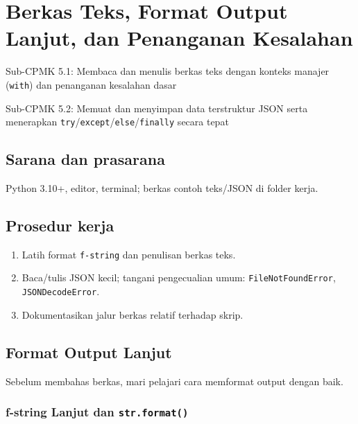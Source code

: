 \documentclass[../main.tex]{subfiles}
\begin{document}
\chapter{Berkas Teks, Format Output Lanjut, dan Penanganan Kesalahan}

\begin{subcpmk}
  \item Sub-CPMK 5.1: Membaca dan menulis berkas teks dengan konteks manajer (\texttt{with}) dan penanganan kesalahan dasar
  \item Sub-CPMK 5.2: Memuat dan menyimpan data terstruktur JSON serta menerapkan \texttt{try}/\texttt{except}/\texttt{else}/\texttt{finally} secara tepat
\end{subcpmk}


\section{Sarana dan prasarana}

Python 3.10+, editor, terminal; berkas contoh teks/JSON di folder kerja.

\section{Prosedur kerja}

\begin{enumerate}[leftmargin=*]
  \item Latih format \texttt{f-string} dan penulisan berkas teks.
  \item Baca/tulis JSON kecil; tangani pengecualian umum:\newline
  \texttt{FileNotFoundError}, \texttt{JSONDecodeError}.
  \item Dokumentasikan jalur berkas relatif terhadap skrip.
\end{enumerate}

\section{Format Output Lanjut}

Sebelum membahas berkas, mari pelajari cara memformat output dengan baik.

\subsection{f-string Lanjut dan \texttt{str.format()}}
\end{document}
